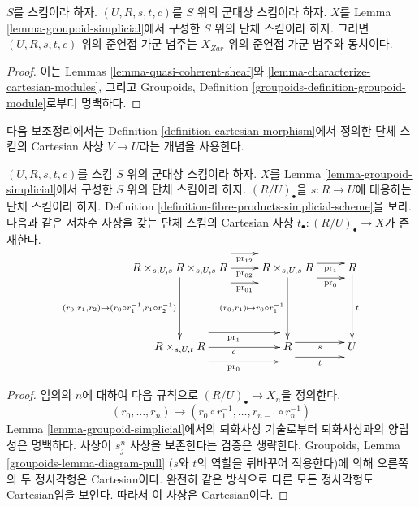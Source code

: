 \begin{lemma}
\label{lemma-quasi-coherent-groupoid-simplicial}
$S$를 스킴이라 하자. $(U, R, s, t, c)$를 $S$ 위의 군대상 스킴이라
하자. $X$를 Lemma \ref{lemma-groupoid-simplicial}에서 구성한
$S$ 위의 단체 스킴이라 하자. 그러면 $(U, R, s, t, c)$ 위의
준연접 가군 범주는 $X_{Zar}$ 위의 준연접 가군 범주와 동치이다.
\end{lemma}

\begin{proof}
이는 Lemmas \ref{lemma-quasi-coherent-sheaf}와
\ref{lemma-characterize-cartesian-modules}, 그리고 Groupoids,
Definition \ref{groupoids-definition-groupoid-module}로부터 명백하다.
\end{proof}

\noindent
다음 보조정리에서는 Definition \ref{definition-cartesian-morphism}에서
정의한 단체 스킴의 Cartesian 사상 $V \to U$라는 개념을 사용한다.

\begin{lemma}
\label{lemma-quasi-coherent-groupoid-R-cartesian}
$(U, R, s, t, c)$를 스킴 $S$ 위의 군대상 스킴이라 하자.
$X$를 Lemma \ref{lemma-groupoid-simplicial}에서 구성한 $S$ 위의
단체 스킴이라 하자. $(R/U)_\bullet$을
$s : R \to U$에 대응하는 단체 스킴이라 하자. Definition
\ref{definition-fibre-products-simplicial-scheme}을 보라.
다음과 같은 저차수 사상을 갖는 단체 스킴의 Cartesian 사상
$t_\bullet : (R/U)_\bullet \to X$가 존재한다.
$$
\xymatrix{
R \times_{s, U, s} R \times_{s, U, s} R
\ar@<3ex>[r]_-{\text{pr}_{12}}
\ar@<0ex>[r]_-{\text{pr}_{02}}
\ar@<-3ex>[r]_-{\text{pr}_{01}}
\ar[dd]_{(r_0, r_1, r_2) \mapsto (r_0 \circ r_1^{-1}, r_1 \circ r_2^{-1})} &
R \times_{s, U, s} R
\ar@<1ex>[r]_-{\text{pr}_1} \ar@<-2ex>[r]_-{\text{pr}_0}
\ar[dd]_{(r_0, r_1) \mapsto r_0 \circ r_1^{-1}} &
R \ar[dd]^t
\\
\\
R \times_{s, U, t} R
\ar@<3ex>[r]_{\text{pr}_1}
\ar@<0ex>[r]_c
\ar@<-3ex>[r]_{\text{pr}_0} &
R \ar@<1ex>[r]_s \ar@<-2ex>[r]_t &
U
}
$$
\end{lemma}

\begin{proof}
임의의 $n$에 대하여 다음 규칙으로 $(R/U)_\bullet \to X_n$을 정의한다.
$$
(r_0, \ldots, r_n)
\longrightarrow
(r_0 \circ r_1^{-1}, \ldots, r_{n - 1} \circ r_n^{-1})
$$
Lemma \ref{lemma-groupoid-simplicial}에서의 퇴화사상 기술로부터
퇴화사상과의 양립성은 명백하다.
사상이 $s^n_j$ 사상을 보존한다는 검증은 생략한다.
Groupoids, Lemma \ref{groupoids-lemma-diagram-pull}
($s$와 $t$의 역할을 뒤바꾸어 적용한다)에 의해 오른쪽의 두 정사각형은
Cartesian이다. 완전히 같은 방식으로 다른 모든 정사각형도 Cartesian임을
보인다. 따라서 이 사상은 Cartesian이다.
\end{proof}

